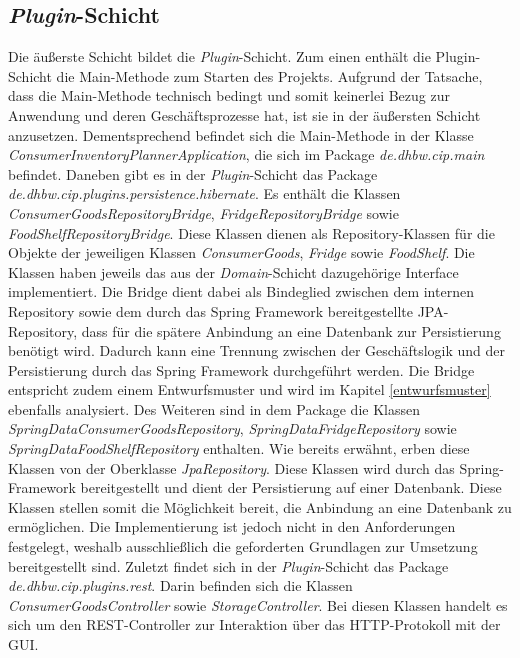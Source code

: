 \subsection*{\textit{Plugin}-Schicht}
Die äußerste Schicht bildet die \textit{Plugin}-Schicht.
Zum einen enthält die Plugin-Schicht die Main-Methode zum Starten des Projekts.
Aufgrund der Tatsache, dass die Main-Methode technisch bedingt und somit keinerlei Bezug zur Anwendung und deren Geschäftsprozesse hat, ist sie in der äußersten Schicht anzusetzen.
Dementsprechend befindet sich die Main-Methode in der Klasse \textit{ConsumerInventoryPlannerApplication}, die sich im Package \textit{de.dhbw.cip.main} befindet.
Daneben gibt es in der \textit{Plugin}-Schicht das Package \textit{de.dhbw.cip.plugins.persistence.hibernate}.
Es enthält die Klassen \textit{ConsumerGoodsRepositoryBridge}, \textit{FridgeRepositoryBridge} sowie \textit{FoodShelfRepositoryBridge}.
Diese Klassen dienen als Repository-Klassen für die Objekte der jeweiligen Klassen \textit{ConsumerGoods}, \textit{Fridge} sowie \textit{FoodShelf}.
Die Klassen haben jeweils das aus der \textit{Domain}-Schicht dazugehörige Interface implementiert.
Die Bridge dient dabei als Bindeglied zwischen dem internen Repository sowie dem durch das Spring Framework bereitgestellte \ac{JPA}-Repository, dass für die spätere Anbindung an eine Datenbank zur Persistierung benötigt wird.
Dadurch kann eine Trennung zwischen der Geschäftslogik und der Persistierung durch das Spring Framework durchgeführt werden.
Die Bridge entspricht zudem einem Entwurfsmuster und wird im Kapitel \ref{entwurfsmuster} ebenfalls analysiert.
Des Weiteren sind in dem Package die Klassen \textit{SpringDataConsumerGoodsRepository}, \textit{SpringDataFridgeRepository} sowie \textit{SpringDataFoodShelfRepository} enthalten.
Wie bereits erwähnt, erben diese Klassen von der Oberklasse \textit{JpaRepository}.
Diese Klassen wird durch das Spring-Framework bereitgestellt und dient der Persistierung auf einer Datenbank.
Diese Klassen stellen somit die Möglichkeit bereit, die Anbindung an eine Datenbank zu ermöglichen.
Die Implementierung ist jedoch nicht in den Anforderungen festgelegt, weshalb ausschließlich die geforderten Grundlagen zur Umsetzung bereitgestellt sind.
Zuletzt findet sich in der \textit{Plugin}-Schicht das Package \textit{de.dhbw.cip.plugins.rest}.
Darin befinden sich die Klassen \textit{ConsumerGoodsController} sowie \textit{StorageController}.
Bei diesen Klassen handelt es sich um den \ac{REST}-Controller zur Interaktion über das HTTP-Protokoll mit der \ac{GUI}.
